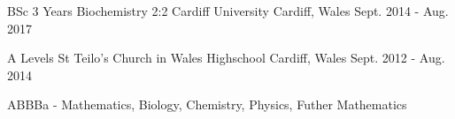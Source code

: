 

\begin{cventries}

  \cventry
    {BSc 3 Years Biochemistry 2:2} %
    {Cardiff University} %
    {Cardiff, Wales} %
    {Sept. 2014 - Aug. 2017} %
    {
      \begin{cvitems} %
      \end{cvitems}
    }

\cventry
    {A Levels} %
    {St Teilo's Church in Wales Highschool} %
    {Cardiff, Wales} %
    {Sept. 2012 - Aug. 2014} %
    {
      \begin{cvitems} %
        \item {ABBBa - Mathematics, Biology, Chemistry, Physics, Futher Mathematics}
      \end{cvitems}
    }

\end{cventries}
